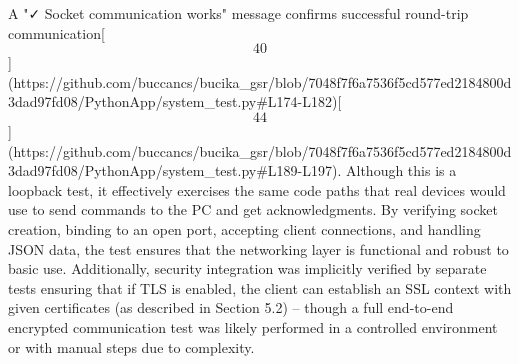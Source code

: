 \documentclass[12pt,a4paper]{article}
\begin{document}
{A "✓ Socket communication works" message confirms successful round-trip
communication[\[40\]](https://github.com/buccancs/bucika_gsr/blob/7048f7f6a7536f5cd577ed2184800d3dad97fd08/PythonApp/system_test.py#L174-L182)[\[44\]](https://github.com/buccancs/bucika_gsr/blob/7048f7f6a7536f5cd577ed2184800d3dad97fd08/PythonApp/system_test.py#L189-L197).
Although this is a loopback test, it effectively exercises the same code
paths that real devices would use to send commands to the PC and get
acknowledgments. By verifying socket creation, binding to an open port,
accepting client connections, and handling JSON data, the test ensures
that the networking layer is functional and robust to basic use.
Additionally, security integration was implicitly verified by separate
tests ensuring that if TLS is enabled, the client can establish an SSL
context with given certificates (as described in Section 5.2) -- though
a full end-to-end encrypted communication test was likely performed in a
controlled environment or with manual steps due to complexity.

}
\end{document}
